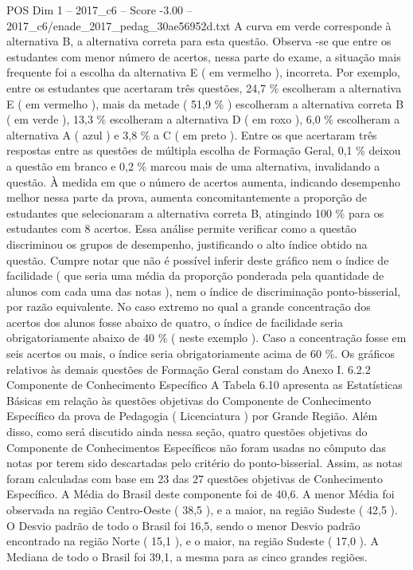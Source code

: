 \begin{textsample}{POS Dim 1 – 2017\_c6 – Score -3.00 – 2017\_c6/enade\_2017\_pedag\_30ae56952d.txt}
A curva em verde corresponde à alternativa B, a alternativa correta para esta questão.
Observa -se que entre os estudantes com menor número de acertos, nessa parte do exame, a situação mais frequente foi a escolha da alternativa E ( em vermelho ), incorreta.
Por exemplo, entre os estudantes que acertaram três questões, 24,7 \% escolheram a alternativa E ( em vermelho ), mais da metade ( 51,9 \% ) escolheram a alternativa correta B ( em verde ), 13,3 \% escolheram a alternativa D ( em roxo ), 6,0 \% escolheram a alternativa A ( azul ) e 3,8 \% a C ( em preto ).
Entre os que acertaram três respostas entre as questões de múltipla escolha de Formação Geral, 0,1 \% deixou a questão em branco e 0,2 \% marcou mais de uma alternativa, invalidando a questão.
À medida em que o número de acertos aumenta, indicando desempenho melhor nessa parte da prova, aumenta concomitantemente a proporção de estudantes que selecionaram a alternativa correta B, atingindo 100 \% para os estudantes com 8 acertos.
Essa análise permite verificar como a questão discriminou os grupos de desempenho, justificando o alto índice obtido na questão.
Cumpre notar que não é possível inferir deste gráfico nem o índice de facilidade ( que seria uma média da proporção ponderada pela quantidade de alunos com cada uma das notas ), nem o índice de discriminação ponto-bisserial, por razão equivalente.
No caso extremo no qual a grande concentração dos acertos dos alunos fosse abaixo de quatro, o índice de facilidade seria obrigatoriamente abaixo de 40 \% ( neste exemplo ).
Caso a concentração fosse em seis acertos ou mais, o índice seria obrigatoriamente acima de 60 \%.
Os gráficos relativos às demais questões de Formação Geral constam do Anexo I. 6.2.2 Componente de Conhecimento Específico A Tabela 6.10 apresenta as Estatísticas Básicas em relação às questões objetivas do Componente de Conhecimento Específico da prova de Pedagogia ( Licenciatura ) por Grande Região.
Além disso, como será discutido ainda nessa seção, quatro questões objetivas do Componente de Conhecimentos Específicos não foram usadas no cômputo das notas por terem sido descartadas pelo critério do ponto-bisserial.
Assim, as notas foram calculadas com base em 23 das 27 questões objetivas de Conhecimento Específico.
A Média do Brasil deste componente foi de 40,6.
A menor Média foi observada na região Centro-Oeste ( 38,5 ), e a maior, na região Sudeste ( 42,5 ).
O Desvio padrão de todo o Brasil foi 16,5, sendo o menor Desvio padrão encontrado na região Norte ( 15,1 ), e o maior, na região Sudeste ( 17,0 ).
A Mediana de todo o Brasil foi 39,1, a mesma para as cinco grandes regiões.

\end{textsample}
